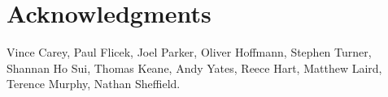 \documentclass[12pt]{article} \usepackage[utf8]{inputenc}
\begin{document}
\section*{Acknowledgments}

Vince Carey, Paul Flicek, Joel Parker, Oliver Hoffmann, Stephen
Turner, Shannan Ho Sui, Thomas Keane, Andy Yates, Reece Hart, Matthew
Laird, Terence Murphy, Nathan Sheffield.

\nocite{*}


\end{document}
